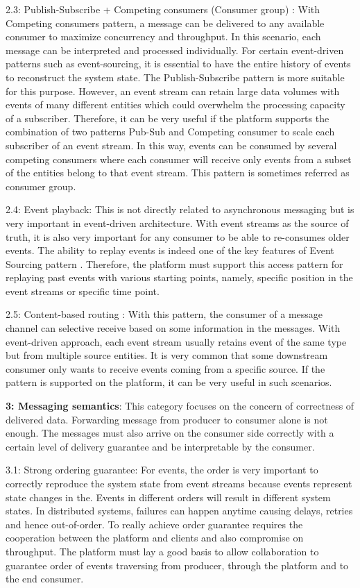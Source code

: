 2.3: Publish-Subscribe + Competing consumers (Consumer group) \cite{messagingcompetingconsumer}:
With Competing consumers pattern, a message can be delivered to any available consumer to maximize concurrency and throughput. In this scenario, each message can be interpreted and processed individually. For certain event-driven patterns such as event-sourcing, it is essential to have the entire history of events to reconstruct the system state. The Publish-Subscribe pattern is more suitable for this purpose. However, an event stream can retain large data volumes with events of many different entities which could overwhelm the processing capacity of a subscriber. Therefore, it can be very useful if the platform supports the combination of two patterns Pub-Sub and Competing consumer to scale each subscriber of an event stream. In this way, events can be consumed by several competing consumers where each consumer will receive only events from a subset of the entities belong to that event stream. This pattern is sometimes referred as consumer group.

2.4: Event playback: This is not directly related to asynchronous messaging but is very important in event-driven architecture. With event streams as the source of truth, it is also very important for any consumer to be able to re-consumes older events. The ability to replay events is indeed one of the key features of Event Sourcing pattern \cite{eventsourcingfowler}. Therefore, the platform must support this access pattern for replaying past events with various starting points, namely, specific position in the event streams or specific time point.

2.5: Content-based routing \cite{messagingcontainedbasedrouter}: 
With this pattern, the consumer of a message channel can selective receive based on some information in the messages. With event-driven approach, each event stream usually retains event of the same type but from multiple source entities. It is very common that some downstream consumer only wants to receive events coming from a specific source. If the pattern is supported on the platform, it can be very useful in such scenarios. 

\textbf{3: Messaging semantics}: This category focuses on the concern of correctness of delivered data. Forwarding message from producer to consumer alone is not enough. The messages must also arrive on the consumer side correctly with a certain level of delivery guarantee and be interpretable by the consumer. 

3.1: Strong ordering guarantee: For events, the order is very important to correctly reproduce the system state from event streams because events represent state changes in the. Events in different orders will result in different system states. In distributed systems, failures can happen anytime causing delays, retries and hence out-of-order. To really achieve order guarantee requires the cooperation between the platform and clients and also compromise on throughput. The platform must lay a good basis to allow collaboration to guarantee order of events traversing from producer, through the platform and to the end consumer.


